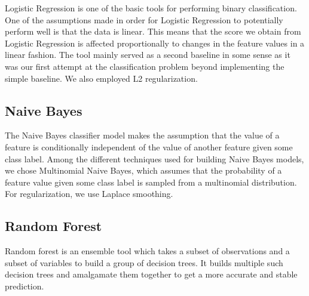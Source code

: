 \documentclass[12pt,a4paper,english]{amsart}
\begin{document}
Logistic Regression is one of the basic tools for performing binary classification. One of the assumptions made in order for Logistic Regression to potentially perform well is that the data is linear. This means that the score we obtain from Logistic Regression is affected proportionally to changes in the feature values in a linear fashion. The tool mainly served as a second baseline in some sense as it was our first attempt at the classification problem beyond implementing the simple baseline. We also employed L2 regularization.

\subsection*{Naive Bayes}

The Naive Bayes classifier model makes the assumption that the value of a feature is conditionally independent of the value of another feature given some class label. Among the different techniques used for building Naive Bayes models, we chose Multinomial Naive Bayes, which assumes that the probability of a feature value given some class label is sampled from a multinomial distribution. For regularization, we use Laplace smoothing.

\subsection*{Random Forest}

Random forest is an ensemble tool which takes a subset of observations and a subset of variables to build a group of decision trees. It builds multiple such decision trees and amalgamate them together to get a more accurate and stable prediction.




%
\end{document}
